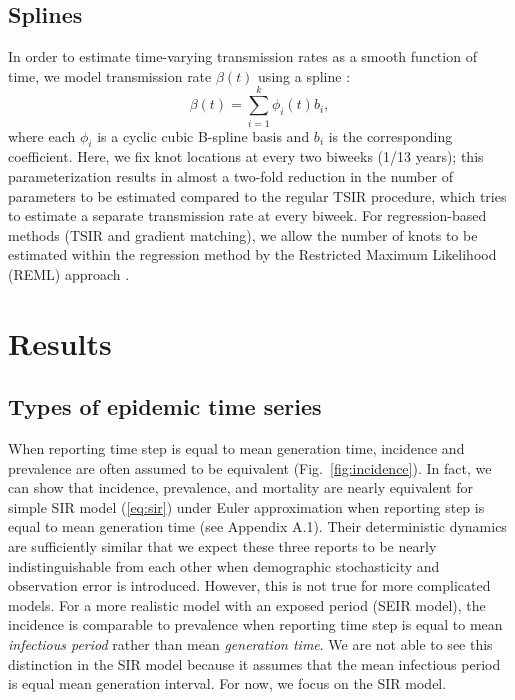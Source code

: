 \documentclass{article}
\newcommand{\eref}[1]{(\ref{eq:#1})}
\newcommand{\fref}[1]{Fig.~\ref{fig:#1}}
\begin{document}
\subsection{Splines}

In order to estimate time-varying transmission rates as a smooth function of time, we model transmission rate $\beta(t)$ using a spline \citep{hooker2010parameterizing}:
\begin{equation}
\beta(t) = \sum_{i=1}^k \phi_i(t) b_i,
\end{equation}
where each $\phi_i$ is a cyclic cubic B-spline basis and $b_i$ is the corresponding coefficient.
Here, we fix knot locations at every two biweeks (1/13 years);
this parameterization results in almost a two-fold reduction in the number of parameters to be estimated compared to the regular TSIR procedure, which tries to estimate a separate transmission rate at every biweek.
For regression-based methods (TSIR and gradient matching), we allow the number of knots to be estimated within the regression method by the Restricted Maximum Likelihood (REML) approach \citep{wood2012mgcv}.

\section{Results}

\subsection{Types of epidemic time series}

When reporting time step is equal to mean generation time, incidence and prevalence are often assumed to be equivalent (\fref{incidence}).
In fact, we can show that incidence, prevalence, and mortality are nearly equivalent for simple SIR model \eref{sir} under Euler approximation when reporting step is equal to mean generation time (see Appendix A.1).
Their deterministic dynamics are sufficiently similar that we expect these three reports to be nearly indistinguishable from each other when demographic stochasticity and observation error is introduced.
However, this is not true for more complicated models.
For a more realistic model with an exposed period (SEIR model), the incidence is comparable to prevalence when reporting time step is equal to mean \emph{infectious period} rather than mean \emph{generation time}.
We are not able to see this distinction in the SIR model because it assumes that the mean infectious period is equal mean generation interval.
For now, we focus on the SIR model.
\end{document}
